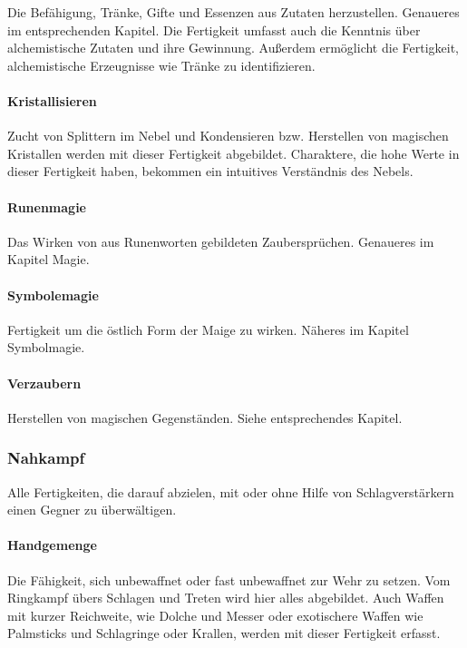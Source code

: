 \documentclass{article}
\begin{document}
Die Befähigung, Tränke, Gifte und Essenzen aus Zutaten herzustellen. Genaueres im entsprechenden Kapitel. Die Fertigkeit
umfasst auch die Kenntnis über alchemistische Zutaten und ihre Gewinnung. Außerdem ermöglicht die Fertigkeit,
alchemistische Erzeugnisse wie Tränke zu identifizieren.

\paragraph{Kristallisieren}

Zucht von Splittern im Nebel und Kondensieren bzw. Herstellen von magischen Kristallen werden mit dieser Fertigkeit
abgebildet. Charaktere, die hohe Werte in dieser Fertigkeit haben, bekommen ein intuitives Verständnis des Nebels.

\paragraph{Runenmagie}

Das Wirken von aus Runenworten gebildeten Zaubersprüchen. Genaueres im Kapitel Magie.

\paragraph{Symbolemagie}

Fertigkeit um die östlich Form der Maige zu wirken. Näheres im Kapitel Symbolmagie.

\paragraph{Verzaubern}

Herstellen von magischen Gegenständen. Siehe entsprechendes Kapitel.

\subsubsection{Nahkampf}

Alle Fertigkeiten, die darauf abzielen, mit oder ohne Hilfe von Schlagverstärkern einen Gegner zu überwältigen.

\paragraph{Handgemenge}

Die Fähigkeit, sich unbewaffnet oder fast unbewaffnet zur Wehr zu setzen. Vom Ringkampf übers Schlagen und Treten
wird hier alles abgebildet. Auch Waffen mit kurzer Reichweite, wie Dolche und Messer oder exotischere Waffen wie
Palmsticks und Schlagringe oder Krallen, werden mit dieser Fertigkeit erfasst.
\end{document}
